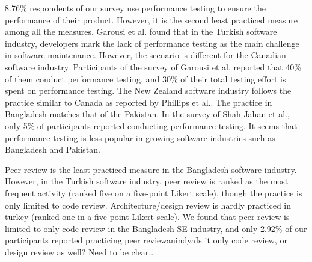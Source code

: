 8.76\% respondents of our survey use performance testing to ensure the performance of their product.  However, it is the second least practiced measure among all the measures. Garousi et al.\cite{Garousi2015} found that in the Turkish software industry, developers mark the lack of performance testing as the main challenge in software maintenance. However, the scenario is different for the Canadian software industry. Participants of the survey of Garousi et al.\cite{Garousi2013} reported that 40\% of them conduct performance testing, and 30\% of their total testing effort is spent on performance testing. The New Zealand software industry follows the practice similar to Canada as reported by Phillips et al.\cite{Phillips2003}. %
The practice in Bangladesh matches that of the Pakistan. 
In the survey of Shah Jahan et al.\cite{Jahan2019}, only 5\% of participants reported conducting performance testing. It seems that performance testing is less popular in growing software industries such as Bangladesh and Pakistan.

Peer review is the least practiced measure in the Bangladesh software industry. However, in the Turkish software industry, peer review is ranked as the most frequent activity\cite{Garousi2015} (ranked five on a five-point Likert scale), though the practice is only limited to code review. Architecture/design review is  hardly practiced in turkey (ranked one in a five-point Likert scale). We found that peer review is limited to only code review in the Bangladesh SE industry, and only 2.92\% of our participants reported practicing peer reviewanindya{Is it only code review, or design review as well? Need to be clear.}.

